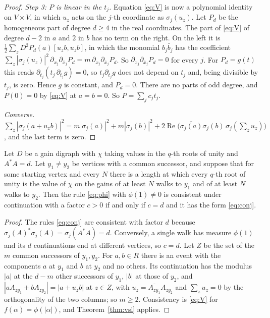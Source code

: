 \begin{proof}
\emph{Step 3: $P$ is linear in the $t_j$.} Equation \eqref{eq:V} is now a polynomial identity on $V\times V$, in which $u_z$ acts on the $j$-th coordinate as $\sigma_j(u_z)$. Let $P_d$ be the homogeneous part of degree $d\ge4$ in the real coordinates. The part of \eqref{eq:V} of degree $d-2$ in $a$ and $2$ in $b$ has no term on the right. On the left it is $\tfrac12\sum_zD^2P_d(a)[u_zb,u_zb]$, in which the monomial $b_j\bar b_j$ has the coefficient $\sum_z|\sigma_j(u_z)|^2\,\partial_{x_j}\partial_{\bar x_j}P_d=m\,\partial_{x_j}\partial_{\bar x_j}P_d$. So $\partial_{x_j}\partial_{\bar x_j}P_d=0$ for every $j$. For $P_d=g(t)$ this reads $\partial_{t_j}(t_j\,\partial_{t_j}g)=0$, so $t_j\partial_{t_j}g$ does not depend on $t_j$ and, being divisible by $t_j$, is zero. Hence $g$ is constant, and $P_d=0$. There are no parts of odd degree, and $P(0)=0$ by \eqref{eq:V} at $a=b=0$. So $P=\sum_jc_jt_j$.

\emph{Converse.} $\sum_z|\sigma_j(a+u_zb)|^2=m|\sigma_j(a)|^2+m|\sigma_j(b)|^2+2\operatorname{Re}\bigl(\overline{\sigma_j(a)}\sigma_j(b)\,\sigma_j(\textstyle\sum_zu_z)\bigr)$, and the last term is zero.
\end{proof}

\begin{corollary}\label{cor:vsl}
Let $D$ be a gain digraph with $\chi$ taking values in the $q$-th roots of unity and $A^*A=d$. Let $y_1\ne y_2$ be vertices with a common successor, and suppose that for some starting vertex and every $N$ there is a length at which every $q$-th root of unity is the value of $\chi$ on the gains of at least $N$ walks to $y_1$ and of at least $N$ walks to $y_2$. Then the rule \eqref{eq:phi} with $\phi(1)\ne0$ is consistent under continuation with a factor $c>0$ if and only if $c=d$ and it has the form \eqref{eq:conj}.
\end{corollary}
\begin{proof}
The rules \eqref{eq:conj} are consistent with factor $d$ because $\sigma_j(A)^*\sigma_j(A)=\sigma_j(A^*A)=d$. Conversely, a single walk has measure $\phi(1)$ and its $d$ continuations end at different vertices, so $c=d$. Let $Z$ be the set of the $m$ common successors of $y_1,y_2$. For $a,b\in R$ there is an event with the components $a$ at $y_1$ and $b$ at $y_2$ and no others. Its continuation has the modulus $|a|$ at the $d-m$ other successors of $y_1$, $|b|$ at those of $y_2$, and $|aA_{zy_1}+bA_{zy_2}|=|a+u_zb|$ at $z\in Z$, with $u_z=\overline{A_{zy_1}}A_{zy_2}$ and $\sum_zu_z=0$ by the orthogonality of the two columns; so $m\ge2$. Consistency is \eqref{eq:V} for $f(\alpha)=\phi(|\alpha|)$, and Theorem~\ref{thm:vsl} applies.
\end{proof}

